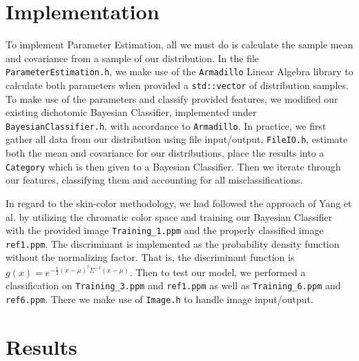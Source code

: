 \documentclass[ 12pt ]{article}
\begin{document}
\section*{Implementation}

To implement Parameter Estimation, all we must do is calculate the sample mean and covariance from a sample of our distribution. In the file \verb|ParameterEstimation.h|, we make use of
the \verb|Armadillo| Linear Algebra library to calculate both parameters when provided a \verb|std::vector| of distribution samples. To make use of the parameters and classify provided
features, we modified our existing dichotomic Bayesian Classifier, implemented under \verb|BayesianClassifier.h|, with accordance to \verb|Armadillo|. In practice, we first gather all
data from our distribution using file input/output, \verb|FileIO.h|, estimate both the mean and covariance for our distributions, place the results into a \verb|Category| which is
then given to a Bayesian Classifier. Then we iterate through our features, classifying them and accounting for all misclassifications.

In regard to the skin-color methodology, we had followed the approach of Yang et al. by utilizing the chromatic color space and training our Bayesian Classifier with the provided image
\verb|Training_1.ppm| and the properly classified image \verb|ref1.ppm|. The discriminant is implemented as the probability density function without the normalizing factor. That is, the discriminant function is $g(x)= e^{-\frac{1}{2}(x - \mu)^t \Sigma^{-1} (x - \mu)}$.
Then to test our model, we performed a classification on \verb|Training_3.ppm| and \verb|ref1.ppm| as well as
\verb|Training_6.ppm| and \verb|ref6.ppm|. There we make use of \verb|Image.h| to handle image input/output.

\section*{Results}
\end{document}
